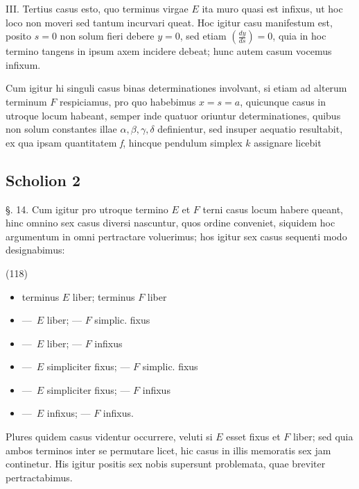 \documentclass[11pt,a4paper]{article}
\begin{document}
III. Tertius casus esto, quo terminus virgae $E$ ita muro quasi est
infixus, ut hoc loco non moveri sed tantum incurvari queat. Hoc igitur casu
manifestum est, posito $s = 0$ non solum fieri debere $y = 0$, sed etiam
$\left(\frac{dy}{ds}\right) = 0$, quia in hoc termino tangens in ipsum axem
incidere debeat; hunc autem casum vocemus infixum.

Cum igitur hi singuli casus binas determinationes involvant, si etiam ad
alterum terminum $F$ respiciamus, pro quo habebimus $x = s = a$, quicunque
casus in utroque locum habeant, semper inde quatuor oriuntur determinationes,
quibus non solum constantes illae $\alpha, \beta, \gamma, \delta$ definientur,
sed insuper aequatio resultabit, ex qua ipsam quantitatem \emph{f}, hincque
pendulum simplex $k$ assignare licebit

\subsection{Scholion 2}

§. 14. Cum igitur pro utroque termino $E$ et $F$ terni casus locum habere
queant, hinc omnino sex casus diversi nascuntur, quos ordine
 conveniet, siquidem hoc argumentum in omni
 pertractare voluerimus; hos igitur sex casus sequenti
modo designabimus:

(118)

\begin{itemize}
  \item[I] terminus $E$ liber; \quad terminus $F$ liber
  \item[II.] ---\ $E$ liber; --- $F$ simplic. fixus
  \item[III] ---\ $E$ liber; --- $F$ infixus
  \item[IV] ---\ $E$ simpliciter fixus; --- $F$ simplic. fixus
  \item[V.] ---\ $E$ simpliciter fixus; --- $F$ infixus
  \item[VI.] ---\ $E$ infixus; --- $F$ infixus.
\end{itemize}

Plures quidem casus videntur occurrere, veluti si $E$ esset fixus et $F$
liber; sed quia ambos terminos inter se permutare licet, hic casus in illis
memoratis sex jam continetur. His igitur positis sex nobis supersunt
problemata, quae breviter pertractabimus.
\end{document}
